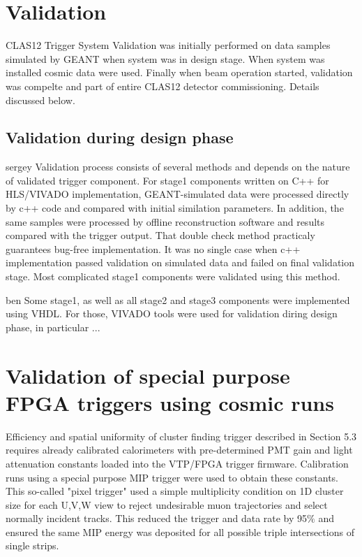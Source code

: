 \section{Validation}

CLAS12 Trigger System Validation was initially performed on data samples simulated by GEANT when system was in design stage. When system was installed cosmic data were used. Finally when beam operation started, validation was compelte and part of entire CLAS12 detector commissioning. Details discussed below.

\subsection{Validation during design phase}

sergey
Validation process consists of several methods and depends on the nature of validated trigger component. For stage1 components written on C++ for HLS/VIVADO implementation,
GEANT-simulated data were processed directly by c++ code and compared with initial similation parameters. 
In addition, the same samples were processed by offline reconstruction software and results compared with the trigger output. 
That double check method practicaly guarantees bug-free implementation. It was no single case when c++ implementation passed validation on
simulated data and failed on final validation stage. Most complicated stage1 components were validated using this method.

ben
Some stage1, as well as all stage2 and stage3 components were implemented using VHDL. For those, VIVADO tools were used for validation diring design phase, in particular ...

\section{Validation of special purpose FPGA triggers using cosmic runs} 

Efficiency and spatial uniformity of cluster finding trigger described in Section 5.3 requires already calibrated calorimeters with pre-determined PMT gain and light attenuation constants loaded into the VTP/FPGA trigger firmware.  Calibration runs using a special purpose MIP trigger were used to obtain these constants.  This so-called "pixel trigger" used a simple multiplicity condition on 1D cluster size for each U,V,W view to reject undesirable muon trajectories and select normally incident tracks.  This reduced the trigger and data rate by 95$\%$ and ensured the same MIP energy was deposited for all possible triple intersections of single strips.  

